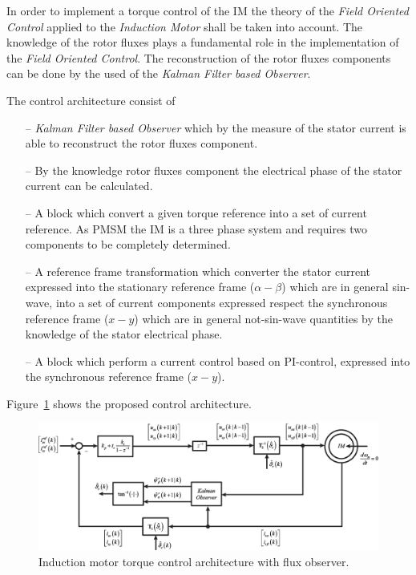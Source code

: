 \documentclass[11pt,a4paper,oneside]{book}
\numberwithin{equation}{section}
\theoremstyle{it}
\theoremstyle{definition}
\begin{document}
In order to implement a torque control of the IM the theory of the 
\textit{Field Oriented Control} applied to the \textit{Induction Motor} shall 
be taken into account. The knowledge of the rotor fluxes plays a fundamental 
role in the implementation of the \textit{Field Oriented Control}. The 
reconstruction of the rotor fluxes components can be done by the used of the  
\textit{Kalman Filter based Observer}.

The control architecture consist of
\begin{itemize}
	\item[--] \textit{Kalman Filter based Observer} which by the measure of the 
	stator current is able to reconstruct the rotor fluxes component.
	\item[--] By the knowledge rotor fluxes component the electrical phase of 
	the stator current can be calculated.
	\item[--] A block which convert a given torque reference into a set of 
	current reference. As PMSM the IM is a three phase system and requires two 
	components to be completely determined.
	\item[--] A reference frame transformation which converter the stator 
	current expressed into the stationary reference frame ($\alpha-\beta$) 
	which are in general sin-wave, into a set of current components expressed 
	respect the synchronous reference frame ($x-y$) which are in general 
	not-sin-wave quantities by the knowledge of the stator electrical phase.
	\item[--] A block which perform a current control based on PI-control, 
	expressed into the synchronous reference frame ($x-y$).
\end{itemize}
Figure~\ref{figure_im_ctrl} shows the proposed control architecture.
\begin{figure}[H]
	\centering
	\includegraphics[width =460pt, 
	keepaspectratio]{figures/kalman/im_ctrl.eps}
	\captionsetup{width=.5\textwidth}
	\caption{Induction motor torque control architecture with flux observer.}
	\label{figure_im_ctrl} 
\end{figure}
\end{document}

